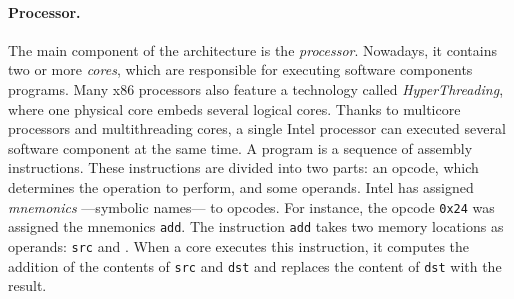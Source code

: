 \paragraph{Processor.}

The main component of the architecture is the \emph{processor}.
%
Nowadays, it contains two or more \emph{cores}, which are responsible for
executing software components programs.
%
Many x86 processors also feature a technology called
\emph{HyperThreading}, where one physical core embeds several
logical cores.
%
Thanks to multicore processors and multithreading cores, a single Intel
processor can executed several software component at the same time.
%
A program is a sequence of assembly instructions.
%
These instructions are divided into two parts: an opcode, which determines the
operation to perform, and some operands.
%
%
Intel has assigned \emph{mnemonics} ---symbolic names--- to opcodes.
%
For instance, the opcode \texttt{0x24} was assigned the mnemonics \texttt{add}.
%
The instruction \texttt{add} takes two memory locations as operands:
\texttt{src} and .
%
When a core executes this instruction, it computes the addition of the contents
of \texttt{src} and \texttt{dst} and replaces the content of \texttt{dst} with
the result.
%

